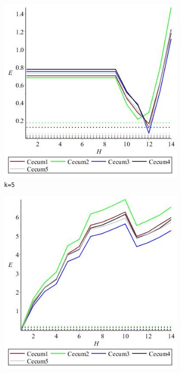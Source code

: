 \documentclass[../../main.tex]{subfiles}
\begin{document}
\begin{figure}[H]
\begin{subfigure}[b]{.5\textwidth}
\includegraphics[width=\textwidth]{precision/minmaxhalf/k5cecum}
\caption{\texttt{k=5}}
\end{subfigure}
\begin{subfigure}[b]{.5\textwidth}
\includegraphics[width=\textwidth]{precision/minmaxhalf/k8cecum}

\end{subfigure}
\end{figure}
\end{document}
